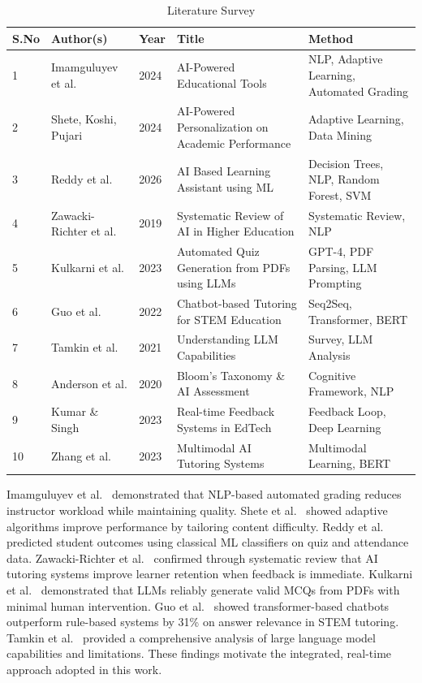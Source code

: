 \documentclass[conference]{IEEEtran}
\begin{document}
\begin{table}[h]
\caption{Literature Survey}
\label{tab:lit}
\centering
\renewcommand{\arraystretch}{1.3}
\begin{tabular}{|p{0.4cm}|p{1.5cm}|p{0.5cm}|p{2.2cm}|p{1.7cm}|}
\hline
\textbf{S.No} & \textbf{Author(s)} & \textbf{Year} & \textbf{Title} & \textbf{Method} \\
\hline
1 & Imamguluyev et al. & 2024 & AI-Powered Educational Tools & NLP, Adaptive Learning, Automated Grading \\
\hline
2 & Shete, Koshi, Pujari & 2024 & AI-Powered Personalization on Academic Performance & Adaptive Learning, Data Mining \\
\hline
3 & Reddy et al. & 2026 & AI Based Learning Assistant using ML & Decision Trees, NLP, Random Forest, SVM \\
\hline
4 & Zawacki-Richter et al. & 2019 & Systematic Review of AI in Higher Education & Systematic Review, NLP \\
\hline
5 & Kulkarni et al. & 2023 & Automated Quiz Generation from PDFs using LLMs & GPT-4, PDF Parsing, LLM Prompting \\
\hline
6 & Guo et al. & 2022 & Chatbot-based Tutoring for STEM Education & Seq2Seq, Transformer, BERT \\
\hline
7 & Tamkin et al. & 2021 & Understanding LLM Capabilities & Survey, LLM Analysis \\
\hline
8 & Anderson et al. & 2020 & Bloom's Taxonomy \& AI Assessment & Cognitive Framework, NLP \\
\hline
9 & Kumar \& Singh & 2023 & Real-time Feedback Systems in EdTech & Feedback Loop, Deep Learning \\
\hline
10 & Zhang et al. & 2023 & Multimodal AI Tutoring Systems & Multimodal Learning, BERT \\
\hline
\end{tabular}
\end{table}

Imamguluyev et al.~\cite{imamguluyev2024} demonstrated that NLP-based automated grading reduces instructor workload while maintaining quality. Shete et al.~\cite{shete2024} showed adaptive algorithms improve performance by tailoring content difficulty. Reddy et al.~\cite{reddy2026} predicted student outcomes using classical ML classifiers on quiz and attendance data. Zawacki-Richter et al.~\cite{zawacki2019} confirmed through systematic review that AI tutoring systems improve learner retention when feedback is immediate. Kulkarni et al.~\cite{kulkarni2023} demonstrated that LLMs reliably generate valid MCQs from PDFs with minimal human intervention. Guo et al.~\cite{guo2022} showed transformer-based chatbots outperform rule-based systems by 31\% on answer relevance in STEM tutoring. Tamkin et al.~\cite{tamkin2021} provided a comprehensive analysis of large language model capabilities and limitations. These findings motivate the integrated, real-time approach adopted in this work.
\end{document}
